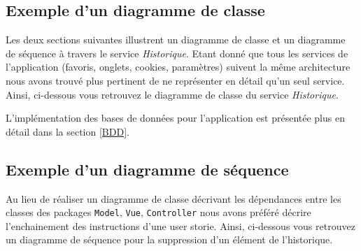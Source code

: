 \documentclass[10pt,a4paper]{article}
\begin{document}
\subsection{Exemple d'un diagramme de classe}
Les deux sections suivantes illustrent un diagramme de classe et un diagramme de séquence à travers le service \textit{Historique}. Etant donné que tous les services de l'application (favoris, onglets, cookies, paramètres) suivent la même architecture nous avons trouvé plus pertinent de ne représenter en détail qu'un seul service. Ainsi, ci-dessous vous retrouvez le diagramme de classe du service \textit{Historique}.

\begin{center}
\end{center}

L'implémentation des bases de données pour l'application est présentée plus en détail dans la section \ref{BDD}.

\subsection{Exemple d'un diagramme de séquence}
Au lieu de réaliser un diagramme de classe décrivant les dépendances entre les classes des packages \verb|Model|, \verb|Vue|, \verb|Controller| nous avons préféré décrire l'enchainement des instructions d'une user storie. Ainsi, ci-dessous vous retrouvez un diagramme de séquence  pour la suppression d'un élément de l'historique. 
\end{document}
